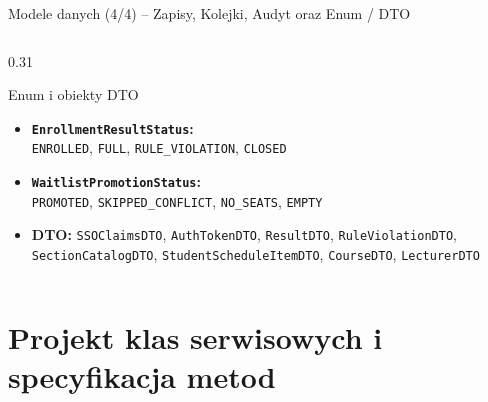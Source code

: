 \documentclass[aspectratio=169, 10pt, xcolor=table]{beamer}
\begin{document}
\begin{frame}{Modele danych (4/4) -- Zapisy, Kolejki, Audyt oraz Enum / DTO}
\begin{columns}[T, onlytextwidth]
\begin{column}{0.31\textwidth}
\begin{exampleblock}{Enum i obiekty DTO}
                \begin{itemize}
                    \item \textbf{\texttt{EnrollmentResultStatus}:}\\ \texttt{ENROLLED}, \texttt{FULL}, \texttt{RULE\_VIOLATION}, \texttt{CLOSED}
                    \item \textbf{\texttt{WaitlistPromotionStatus}:}\\ \texttt{PROMOTED}, \texttt{SKIPPED\_CONFLICT}, \texttt{NO\_SEATS}, \texttt{EMPTY}
                    \item \textbf{DTO:} \texttt{SSOClaimsDTO}, \texttt{AuthTokenDTO}, \texttt{ResultDTO}, \texttt{RuleViolationDTO}, \texttt{SectionCatalogDTO}, \texttt{StudentScheduleItemDTO}, \texttt{CourseDTO}, \texttt{LecturerDTO}
                \end{itemize}
            \end{exampleblock}
        \end{column}
    \end{columns}
\end{frame}

\section{Projekt klas serwisowych i specyfikacja metod}
\end{document}
